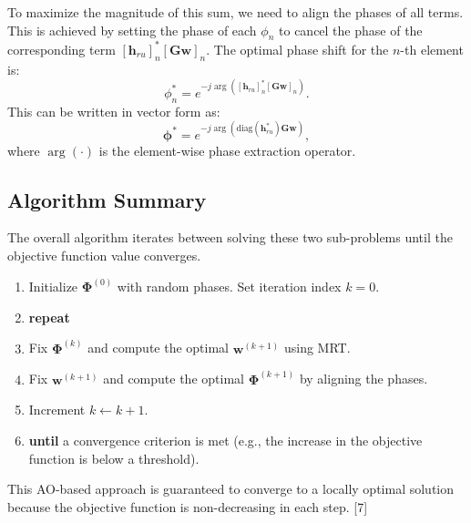 \documentclass[journal,comsoc]{IEEEtran}
\begin{document}
To maximize the magnitude of this sum, we need to align the phases of all terms. This is achieved by setting the phase of each $\phi_n$ to cancel the phase of the corresponding term $[\mathbf{h}_{ru}]_n^* [\mathbf{Gw}]_n$. The optimal phase shift for the $n$-th element is:
\begin{equation}
	\phi_n^* = e^{-j \arg([\mathbf{h}_{ru}]_n^* [\mathbf{Gw}]_n)}.
\end{equation}
This can be written in vector form as:
\begin{equation}
	\boldsymbol{\phi}^* = e^{-j \arg(\mathrm{diag}(\mathbf{h}_{ru}^*) \mathbf{Gw})},
\end{equation}
where $\arg(\cdot)$ is the element-wise phase extraction operator.

\subsection{Algorithm Summary}
The overall algorithm iterates between solving these two sub-problems until the objective function value converges.

\begin{enumerate}
	\item Initialize $\boldsymbol{\Phi}^{(0)}$ with random phases. Set iteration index $k=0$.
	\item \textbf{repeat}
	\item \quad Fix $\boldsymbol{\Phi}^{(k)}$ and compute the optimal $\mathbf{w}^{(k+1)}$ using MRT.
	\item \quad Fix $\mathbf{w}^{(k+1)}$ and compute the optimal $\boldsymbol{\Phi}^{(k+1)}$ by aligning the phases.
	\item \quad Increment $k \leftarrow k+1$.
	\item \textbf{until} a convergence criterion is met (e.g., the increase in the objective function is below a threshold).
\end{enumerate}

This AO-based approach is guaranteed to converge to a locally optimal solution because the objective function is non-decreasing in each step. [7]
\end{document}
